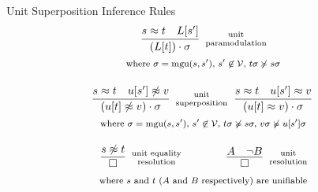
\begin{block}{Unit Superposition Inference Rules}
\begin{gather*}
	\infer
	[\TOPTEXT{unit}{paramodulation}]
	{(L[t])\cdot\sigma}
	{s\foEQ t&L[s']}
\\\text{\footnotesize 
where $\sigma=\mgu(s,s')$,
$s'\not\in\mcV$,
$t\sigma\not\succcurlyeq s\sigma$
}\\[1em]
%
	\infer
	[\TOPTEXT{unit}{superposition}]
	{(u[t]\foNEQ v)\cdot\sigma}
	{s\foEQ t&u[s']\foNEQ v}
	\hspace{2mm}
	\infer
	[]
	{(u[t]\foEQ v)\cdot\sigma}
	{s\foEQ t&u[s']\foEQ v}
\\\text{\footnotesize 
where $\sigma=\mgu(s,s')$,
$s'\not\in\mathcal{V},$
$t\sigma\not\succcurlyeq s\sigma,$
$v\sigma\not\succcurlyeq u[s']\sigma$
}\\[1em]
%
	\infer
	[\TOPTEXT{unit equality}{resolution}]
	{\emptyclause}
	{s\foNEQ t}
	\hspace{4em}
	\infer
	[\TOPTEXT{unit}{resolution}]
	{\emptyclause}
	{A&\lnot B}\\
\text{\footnotesize 
where $s$ and $t$ ($A$ and $B$ respectively) are unifiable
}
\end{gather*}
\end{block}